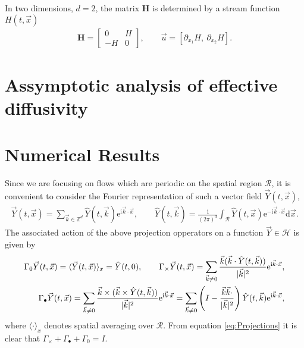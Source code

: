 \documentclass[11pt]{amsart}
\newcommand{\I}{\mathrm{i}}
\newcommand{\e}{\mathrm{e}}
\renewcommand{\d}{\mathrm{d}}
\newcommand{\Hb}{\mathbf{H}}
\newcommand{\Rc}{\mathcal{R}}
\newcommand{\Hs}{\mathscr{H}}
\begin{document}
In two dimensions, $d=2$, the matrix $\Hb$ is determined by a stream
function $H(t,\vec{x})$ 
%
\begin{align}\label{eq:u_H}  
  \Hb=\left[
  \begin{array}{cc}
    0  & H\\
    -H & 0
  \end{array}
  \right],
  \qquad
  \vec{u}=[\partial_{x_1}H, \ \partial_{x_2}H].
\end{align}
%

\section{Assymptotic analysis of effective
  diffusivity} \label{sec:Assymptotics} 


\section{Numerical Results}\label{sec:Num_Results}
%
Since we are focusing on flows which are periodic on the spatial
region $\Rc$, it is convenient to consider the Fourier
representation of such a vector field $\vec{Y}(t,\vec{x})$, 
%
\begin{align}
  \vec{Y}(t,\vec{x})
    =\sum_{\vec{k}\in\mathbb{Z}^d}
       \hat{Y}(t,\vec{k})\e^{\I\vec{k}\cdot\vec{x}},
  \qquad
  \hat{Y}(t,\vec{k})
    =\frac{1}{(2\pi)^d}\int_{\Rc}
       \hat{Y}(t,\vec{x})\e^{-\I\vec{k}\cdot\vec{x}} \d\vec{x}.
\end{align}
%
The associated action of the above projection opperators on a function
$\vec{Y}\in\Hs$ is given by \cite{Fannjiang:SIAM_JAM:333} 
%
\begin{align}\label{eq:Projections}
  \Gamma_0\vec{Y}(t,\vec{x})
    =\langle\vec{Y}(t,\vec{x})\rangle_x
    =\hat{Y}(t,0),
    \qquad
  \Gamma_\times\vec{Y}(t,\vec{x})
    =\sum_{\vec{k}\neq0}
       \frac{\vec{k}(\vec{k}\cdot\hat{Y}(t,\vec{k}))}{|\vec{k}|^2}
       \e^{\I\vec{k}\cdot\vec{x}},
    \\
  \Gamma_\bullet\vec{Y}(t,\vec{x})
    =\sum_{\vec{k}\neq0}
       \frac{\vec{k}\times(\vec{k}\times\hat{Y}(t,\vec{k}))}{|\vec{k}|^2}
       \e^{\I\vec{k}\cdot\vec{x}}
    =\sum_{\vec{k}\neq0}\left(I-
       \frac{\vec{k}\vec{k}\cdot}{|\vec{k}|^2}\right) 
       \hat{Y}(t,\vec{k})  \e^{\I\vec{k}\cdot\vec{x}},
       \notag
\end{align}
%
where $\langle\cdot\rangle_x$ denotes spatial averaging over $\Rc$. From
equation \eqref{eq:Projections} it is clear that $\Gamma_\times+\Gamma_\bullet+\Gamma_0=I$.
\end{document}
